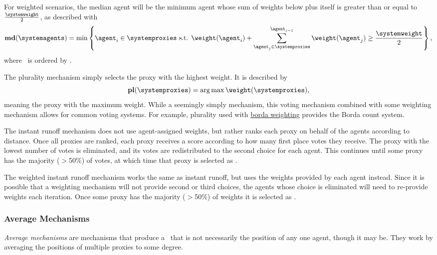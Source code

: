 For weighted scenarios, the median agent will be the minimum agent whose sum of
weights below plus itself is greater than or equal to $\frac{\systemweight}{2}$,
as described with
\begin{equation}
    \textbf{md}(\systemagents) = \min\left\{
    \agent_i \in \systemproxies \text{ s.t. }
    \weightof{\agent_i} +
    \sum_{\agent_j \in \systemproxies}^{\agent_{i - 1}} \weightof{\agent_j}
    \geq \frac{\systemweight}{2}
    \right\}
    \text{,}\label{eq:median-mechanism}
\end{equation}
where \systemproxies\ is ordered by \agenttruth.

The plurality mechanism simply selects the proxy with the highest weight.
It is described by
\begin{equation}
    \textbf{pl}(\systemproxies) =
    \argmax \weightof{\systemproxies}
    \text{,}\label{eq:plurality-mechanism}
\end{equation}
meaning the proxy with the maximum weight.
While a seemingly simply mechanism, this voting mechanism combined with some
weighting mechanism allows for common voting systems.
For example, plurality used with \hyperref[para:borda]{borda weighting}
provides the Borda count system.

\label{para:candidate-instant-runoff}
The instant runoff mechanism does not use agent-assigned weights, but rather
ranks each proxy on behalf of the agents according to distance.
Once all proxies are ranked, each proxy receives a score according to how
many first place votes they receive.
The proxy with the lowest number of votes is eliminated, and its votes are
redistributed to the second choice for each agent.
This continues until some proxy has the majority ($>$50\%) of votes, at which
time that proxy is selected as \systemtruth.

\label{para:candidate-weighted-instant-runoff}
The weighted instant runoff mechanism works the same as instant runoff, but uses
the weights provided by each agent instead.
Since it is possible that a weighting mechanism will not provide second or
third choices, the agents whose choice is eliminated will need to
re-provide weights each iteration.
Once some proxy has the majority ($>$50\%) of weights it is selected as
\systemtruth.

\subsubsection{Average Mechanisms}\label{subsubsec:average-mechanisms}
\textit{Average mechanisms} are mechanisms that produce a \systemtruth\ that
is not necessarily the position of any one agent, though it may be.
They work by averaging the positions of multiple proxies to some degree.

